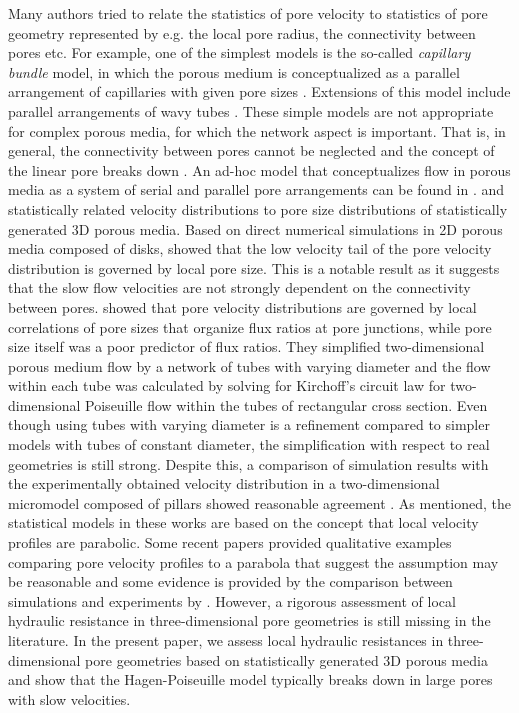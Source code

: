\documentclass[draft]{agujournal2019}
\begin{document}
Many authors tried to relate the statistics of pore velocity to statistics of pore geometry represented by e.g. the local pore radius, the connectivity between pores etc. For example, one of the simplest models is the so-called \emph{capillary bundle} model, in which the porous medium is conceptualized as a parallel arrangement of capillaries with given pore sizes . Extensions of this model include parallel arrangements of wavy tubes . These simple models are not appropriate for complex porous media, for which the network aspect is important. That is, in general, the connectivity between pores cannot be neglected and the concept of the linear pore breaks down . An ad-hoc model that conceptualizes flow in porous media as a system of serial and parallel pore arrangements can be found in \cite{holzner_intermittent_2015}. \cite{siena_relationship_2014} and \cite{hyman_heterogeneities_2012} statistically related velocity distributions to pore size distributions of statistically generated 3D porous media. Based on direct numerical simulations in 2D porous media composed of disks, \cite{de_anna_prediction_2017} showed that the low velocity tail of the pore velocity distribution is governed by local pore size. This is a notable result as it suggests that the slow flow velocities are not strongly dependent on the connectivity between pores. \cite{alim_local_2017} showed that pore velocity distributions are governed by local correlations of pore sizes that organize flux ratios at pore junctions, while pore size itself was a poor predictor of flux ratios. They simplified two-dimensional porous medium flow by a network of tubes with varying diameter and the flow within each tube was calculated by solving for Kirchoff’s circuit law for two-dimensional Poiseuille flow within the tubes of rectangular cross section. Even though using tubes with varying diameter is a refinement compared to simpler models with tubes of constant diameter, the simplification with respect to real geometries is still strong. Despite this, a comparison of simulation results with the experimentally obtained velocity distribution in a two-dimensional micromodel composed of pillars showed reasonable agreement . As mentioned, the statistical models in these works are based on the concept that local velocity profiles are parabolic. Some recent papers provided qualitative examples comparing pore velocity profiles to a parabola that suggest the assumption may be reasonable  and some evidence is provided by the comparison between simulations and experiments by \cite{alim_local_2017}. However, a rigorous assessment of local hydraulic resistance in three-dimensional pore geometries is still missing in the literature. In the present paper, we assess local hydraulic resistances in three-dimensional pore geometries based on statistically generated 3D porous media and show that the Hagen-Poiseuille model typically breaks down in large pores with slow velocities.
\end{document}
